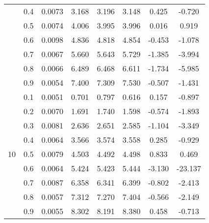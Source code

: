 \documentclass[11pt,a4paper]{report}
\begin{document}
\begin{longtable}{ | c | c || c | c | c | c | c | c | }
 & 0.4 & 0.0073 & 3.168 & 3.196 & 3.148 & 0.425 & -0.720 \\
 & 0.5 & 0.0074 & 4.006 & 3.995 & 3.996 & 0.016 & 0.919 \\
 & 0.6 & 0.0098 & 4.836 & 4.818 & 4.854 & -0.453 & -1.078 \\
 & 0.7 & 0.0067 & 5.660 & 5.643 & 5.729 & -1.385 & -3.994 \\
 & 0.8 & 0.0066 & 6.489 & 6.468 & 6.611 & -1.734 & -5.985 \\
 & 0.9 & 0.0054 & 7.400 & 7.309 & 7.530 & -0.507 & -1.431 \\
 \hline
\multirow{9}{*}{10} & 0.1 & 0.0051 & 0.701 & 0.797 & 0.616 & 0.157 & -0.897 \\
 & 0.2 & 0.0070 & 1.691 & 1.740 & 1.598 & -0.574 & -1.893 \\
 & 0.3 & 0.0081 & 2.636 & 2.651 & 2.585 & -1.104 & -3.349 \\
 & 0.4 & 0.0064 & 3.566 & 3.574 & 3.558 & 0.285 & -0.929 \\
 & 0.5 & 0.0079 & 4.503 & 4.492 & 4.498 & 0.833 & 0.469 \\
 & 0.6 & 0.0064 & 5.424 & 5.423 & 5.444 & -3.130 & -23.137 \\
 & 0.7 & 0.0087 & 6.358 & 6.341 & 6.399 & -0.802 & -2.413 \\
 & 0.8 & 0.0057 & 7.312 & 7.270 & 7.404 & -0.566 & -2.149 \\
 & 0.9 & 0.0055 & 8.302 & 8.191 & 8.380 & 0.458 & -0.713 \\
 \hline
\hline
\end{longtable}
\end{document}
